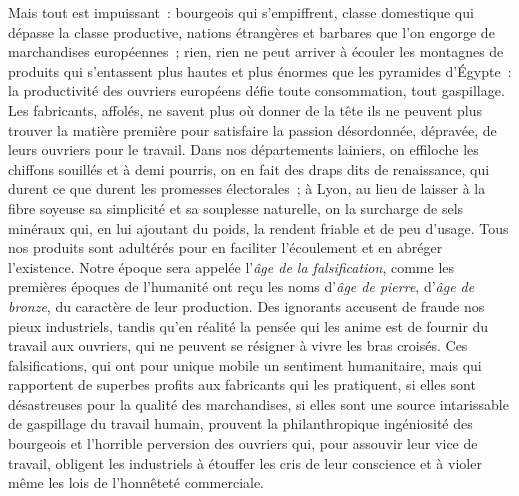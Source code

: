 \documentclass[french,twoside]{book} %
\begin{document}
Mais tout est impuissant : bourgeois qui s’empiffrent, classe domestique qui dépasse la classe productive, nations étrangères et barbares que l’on engorge de marchandises européennes ; rien, rien ne peut arriver à écouler les montagnes de produits qui s’entassent plus hautes et plus énormes que les pyramides d’Égypte : la productivité des ouvriers européens défie toute consommation, tout gaspillage. Les fabricants, affolés, ne savent plus où donner de la tête ils ne peuvent plus trouver la matière première pour satisfaire la passion désordonnée, dépravée, de leurs ouvriers pour le travail. Dans nos départements lainiers, on effiloche les chiffons souillés et à demi pourris, on en fait des draps dits de renaissance, qui durent ce que durent les promesses électorales ; à Lyon, au lieu de laisser à la fibre soyeuse sa simplicité et sa souplesse naturelle, on la surcharge de sels minéraux qui, en lui ajoutant du poids, la rendent friable et de peu d’usage. Tous nos produits sont adultérés pour en faciliter l’écoulement et en abréger l’existence. Notre époque sera appelée l’\emph{âge de la falsification}, comme les premières époques de l’humanité ont reçu les noms d’\emph{âge de pierre}, d’\emph{âge de bronze}, du caractère de leur production. Des ignorants accusent de fraude nos pieux industriels, tandis qu’en réalité la pensée qui les anime est de fournir du travail aux ouvriers, qui ne peuvent se résigner à vivre les bras croisés. Ces falsifications, qui ont pour unique mobile un sentiment humanitaire, mais qui rapportent de superbes profits aux fabricants qui les pratiquent, si elles sont désastreuses pour la qualité des marchandises, si elles sont une source intarissable de gaspillage du travail humain, prouvent la philanthropique ingéniosité des bourgeois et l’horrible perversion des ouvriers qui, pour assouvir leur vice de travail, obligent les industriels à étouffer les cris de leur conscience et à violer même les lois de l’honnêteté commerciale.\par
\end{document}
